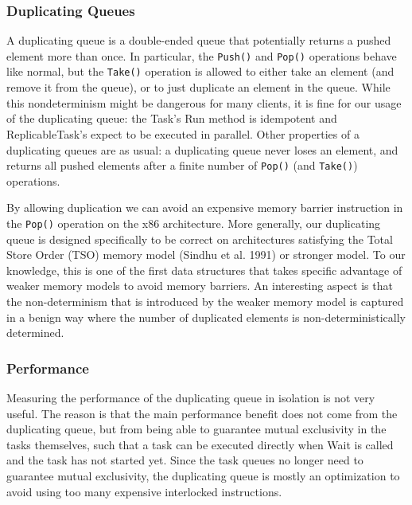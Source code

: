 \subsubsection{Duplicating Queues}

A duplicating queue is a double-ended queue that potentially returns a
pushed element more than once. In particular, the \lstinline!Push()! and
\lstinline!Pop()! operations behave like normal, but the
\lstinline!Take()! operation is allowed to either take an element (and
remove it from the queue), or to just duplicate an element in the
queue. While this nondeterminism might be dangerous for many clients,
it is fine for our usage of the duplicating queue: the Task's Run
method is idempotent and ReplicableTask's expect to be executed in
parallel. Other properties of a duplicating queues are as usual: a
duplicating queue never loses an element, and returns all pushed
elements after a finite number of \lstinline!Pop()! (and
\lstinline!Take()!) operations.

By allowing duplication we can avoid an expensive memory barrier
instruction in the \lstinline!Pop()! operation on the x86
architecture. More generally, our duplicating queue is designed
specifically to be correct on architectures satisfying the Total Store
Order (TSO) memory model (Sindhu et al. 1991) or stronger model. To
our knowledge, this is one of the first data structures that takes
specific advantage of weaker memory models to avoid memory
barriers. An interesting aspect is that the non-determinism that is
introduced by the weaker memory model is captured in a benign way
where the number of duplicated elements is non-deterministically
determined.

\subsubsection{Performance}

Measuring the performance of the duplicating queue in isolation is not
very useful. The reason is that the main performance benefit does not
come from the duplicating queue, but from being able to guarantee
mutual exclusivity in the tasks themselves, such that a task can be
executed directly when Wait is called and the task has not started
yet. Since the task queues no longer need to guarantee mutual
exclusivity, the duplicating queue is mostly an optimization to avoid
using too many expensive interlocked instructions.

